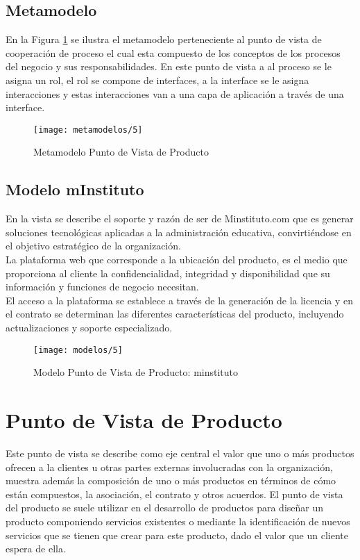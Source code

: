   \subsection{Metamodelo}
  En la Figura \ref{metamodelo5} se ilustra el metamodelo perteneciente al punto de vista de cooperación de proceso el cual esta compuesto de los conceptos de los procesos del negocio y sus responsabilidades. En este punto de vista a al proceso se le asigna un rol, el rol se compone de interfaces, a la interface se le asigna interacciones y estas interacciones van a una capa de aplicación a través de una interface. \cite{ref9}
  
  \begin{figure}[H]
  	\centering
  	\texttt{[image: metamodelos/5]}
  	\captionsetup{width=.95\textwidth}
  	\caption{Metamodelo Punto de Vista de Producto \cite{ref9}}
  	\label{metamodelo5}
  \end{figure}
  
  \subsection{Modelo mInstituto}
  En la vista se describe el soporte y razón de ser de Minstituto.com que es generar soluciones tecnológicas aplicadas a la administración educativa, convirtiéndose en el objetivo estratégico de la organización. \\
  
  La plataforma web que corresponde a la ubicación del producto, es el medio que proporciona al cliente la confidencialidad, integridad y disponibilidad que su información y funciones de negocio necesitan. \\
  
  El acceso a la plataforma se establece a través de la generación de la licencia y en el contrato se determinan las diferentes características del producto, incluyendo actualizaciones y soporte especializado.
  
  \begin{figure}[H]
  	\centering
  	\texttt{[image: modelos/5]}
  	\captionsetup{width=.95\textwidth}
  	\caption{Modelo Punto de Vista de Producto: minstituto}
  	\label{modelo5}
  \end{figure}
  
\section{Punto de Vista de Producto}
Este punto de vista se describe como eje central el valor que uno o más productos ofrecen a la clientes u otras partes externas involucradas con la organización, muestra además la composición de uno o más productos en términos de cómo están compuestos, la asociación, el contrato y otros acuerdos. El punto de vista del producto se suele utilizar en el desarrollo de productos para diseñar un producto componiendo servicios existentes o mediante la identificación de nuevos servicios que se tienen que crear para este producto, dado el valor que un cliente espera de ella. \cite{ref9}


